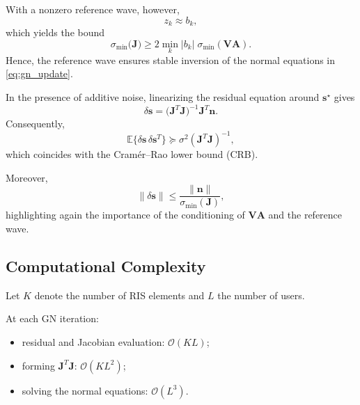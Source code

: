 \documentclass[journal]{IEEEtran}
\begin{document}
With a nonzero reference wave, however,
%
\begin{equation}
z_k \approx b_k ,
\end{equation}
%
which yields the bound
%
\begin{equation}
\sigma_{\min}\big(\mathbf J\big)
\ge
2
\min_k |b_k|
\;
\sigma_{\min}(\mathbf V\mathbf A).
\label{eq:jacobian_bound}
\end{equation}
%
Hence, the reference wave ensures stable inversion of the normal equations in \eqref{eq:gn_update}.


In the presence of additive noise, linearizing the residual equation around $\mathbf s^\star$ gives
%
\begin{equation}
\delta \mathbf s
=
\big(\mathbf J^T\mathbf J\big)^{-1}
\mathbf J^T
\mathbf n .
\end{equation}
%
Consequently,
%
\begin{equation}
\mathbb E\{\delta\mathbf s\,\delta\mathbf s^T\}
\succeq
\sigma^2
(\mathbf J^T\mathbf J)^{-1},
\end{equation}
%
which coincides with the Cram\'er--Rao lower bound (CRB).

Moreover,
%
\begin{equation}
\|
\delta \mathbf s
\|
\le
\frac{\|\mathbf n\|}{\sigma_{\min}(\mathbf J)} ,
\end{equation}
%
highlighting again the importance of the conditioning of $\mathbf V\mathbf A$ and the reference wave.

\subsection{Computational Complexity}

Let $K$ denote the number of RIS elements and $L$ the number of users.

At each GN iteration:
\begin{itemize}
\item residual and Jacobian evaluation: $\mathcal O(KL)$;
\item forming $\mathbf J^T\mathbf J$: $\mathcal O(KL^2)$;
\item solving the normal equations: $\mathcal O(L^3)$.
\end{itemize}
\end{document}
